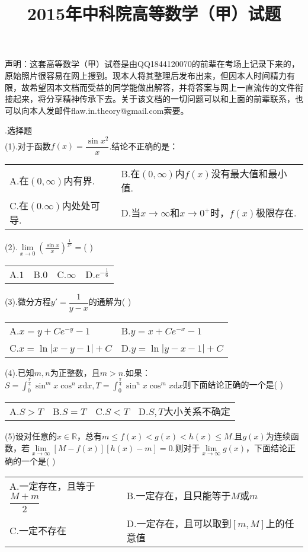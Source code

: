 \documentclass[UTF8]{ctexart}
\date{}
\author{}
\begin{document}
\title{2015年中科院高等数学（甲）试题}
\maketitle
\thispagestyle{empty}
声明：这套高等数学（甲）试卷是由QQ1844120070的前辈在考场上记录下来的，原始照片很容易在网上搜到。现本人将其整理后发布出来，但因本人时间精力有限，故希望因本文档而受益的同学能做出解答，并将答案与网上一直流传的文件衔接起来，将分享精神传承下去。关于该文档的一切问题可以和上面的前辈联系，也可以向本人发邮件flaw.in.theory@gmail.com索要。


.选择题\\
(1).对于函数$ f(x)=\dfrac{\sin{x^2}}{x} $.结论不正确的是：\\
\begin{tabular}{ll}
	A.在$ (0,\infty) $内有界.&
	B.在$ (0,\infty) $内$ f(x) $没有最大值和最小值.\\
	C.在$ (0.\infty) $内处处可导.&
	D.当$ x\rightarrow\infty $和$ x\rightarrow0^+ $时，$ f(x) $极限存在.
\end{tabular}


\noindent(2).$ \lim\limits_{x\rightarrow0}(\frac{\sin{x}}{x})^\frac{1}{x^2}= $(	)\\
\begin{tabular}{llll}
	A.$ 1 $& B.$ 0 $& C.$ \infty $& D.$ e^{-\frac{1}{6}} $
\end{tabular}


\noindent(3).微分方程$ y'=\dfrac{1}{y-x} $的通解为(	)\\
\begin{tabular}{ll}
	A.$ x=y+Ce^{-y}-1 $&
	B.$ y=x+Ce^{-x}-1 $\\
	C.$ x=\ln\left|x-y-1\right|+C $&
	D.$ y=\ln\left|y-x-1\right|+C$
\end{tabular}


\noindent(4).已知$ m,n $为正整数，且$ m>n $.如果：$ S=\int_{0}^{\frac{\pi}{4}}\sin^m{x}\cos^n{x}\mathrm{d}x,T=\int_{0}^{\frac{\pi}{4}}\sin^n{x}\cos^m{x}\mathrm{d}x $则下面结论正确的一个是(	)\\
\begin{tabular}{llll}
	A.$ S>T $& B.$ S=T $& C.$ S<T $& D.$ S,T $大小关系不确定
\end{tabular}


\noindent(5)设对任意的$ x\in\mathbb{R} $，总有$ m\le f(x)<g(x)<h(x)\le M $.且$ g(x) $为连续函数，若$ \lim\limits_{x\rightarrow\infty}[M-f(x)][h(x)-m]=0. $则对于$ \lim\limits_{x\rightarrow\infty}g(x) $，下面结论正确的一个是(	)\\
\begin{tabular}{ll}
	A.一定存在，且等于$ \dfrac{M+m}{2} $&
	B.一定存在，且只能等于$ M $或$ m $\\
	C.一定不存在&
	D.一定存在，且可以取到$ [m,M] $上的任意值
\end{tabular}
\end{document}
